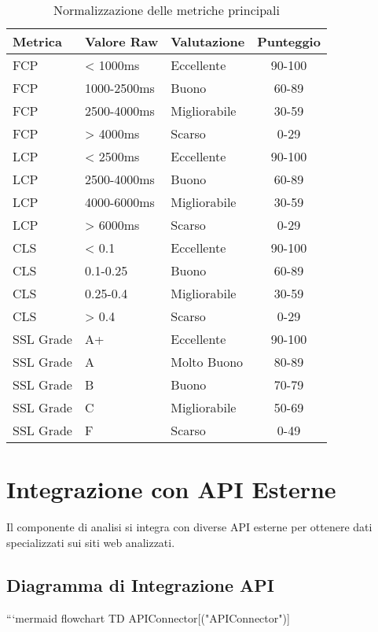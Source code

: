 \begin{table}[H]
\centering
\begin{tabular}{|l|l|l|c|}
\hline
\textbf{Metrica} & \textbf{Valore Raw} & \textbf{Valutazione} & \textbf{Punteggio} \\
\hline
FCP & < 1000ms & Eccellente & 90-100 \\
\hline
FCP & 1000-2500ms & Buono & 60-89 \\
\hline
FCP & 2500-4000ms & Migliorabile & 30-59 \\
\hline
FCP & > 4000ms & Scarso & 0-29 \\
\hline
LCP & < 2500ms & Eccellente & 90-100 \\
\hline
LCP & 2500-4000ms & Buono & 60-89 \\
\hline
LCP & 4000-6000ms & Migliorabile & 30-59 \\
\hline
LCP & > 6000ms & Scarso & 0-29 \\
\hline
CLS & < 0.1 & Eccellente & 90-100 \\
\hline
CLS & 0.1-0.25 & Buono & 60-89 \\
\hline
CLS & 0.25-0.4 & Migliorabile & 30-59 \\
\hline
CLS & > 0.4 & Scarso & 0-29 \\
\hline
SSL Grade & A+ & Eccellente & 90-100 \\
\hline
SSL Grade & A & Molto Buono & 80-89 \\
\hline
SSL Grade & B & Buono & 70-79 \\
\hline
SSL Grade & C & Migliorabile & 50-69 \\
\hline
SSL Grade & F & Scarso & 0-49 \\
\hline
\end{tabular}
\caption{Normalizzazione delle metriche principali}
\label{table:metric-normalization}
\end{table}

\section{Integrazione con API Esterne}
Il componente di analisi si integra con diverse API esterne per ottenere dati specializzati sui siti web analizzati.

\subsection{Diagramma di Integrazione API}

```mermaid
flowchart TD
    APIConnector[("APIConnector")]
    
